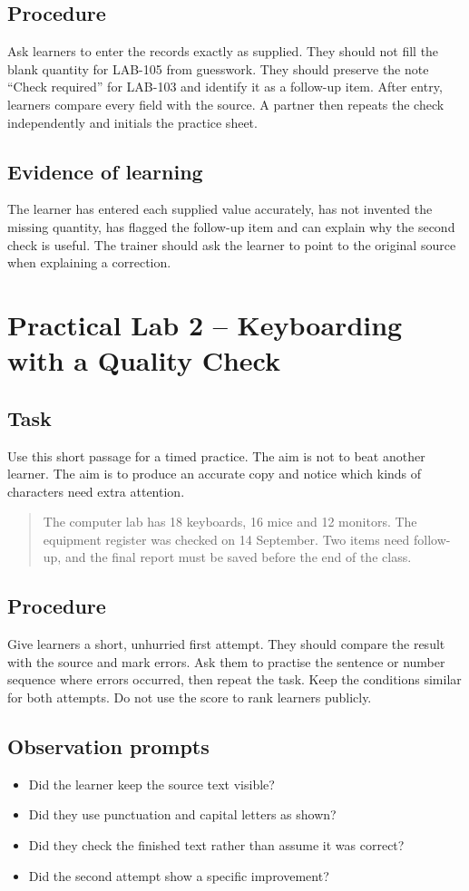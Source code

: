 \documentclass[11pt,openany,oneside]{book}
\begin{document}
\section{Procedure}
Ask learners to enter the records exactly as supplied. They should not fill the blank quantity for LAB-105 from guesswork. They should preserve the note “Check required” for LAB-103 and identify it as a follow-up item. After entry, learners compare every field with the source. A partner then repeats the check independently and initials the practice sheet.
\section{Evidence of learning}
The learner has entered each supplied value accurately, has not invented the missing quantity, has flagged the follow-up item and can explain why the second check is useful. The trainer should ask the learner to point to the original source when explaining a correction.

\chapter{Practical Lab 2 -- Keyboarding with a Quality Check}
\section{Task}
Use this short passage for a timed practice. The aim is not to beat another learner. The aim is to produce an accurate copy and notice which kinds of characters need extra attention.
\begin{quote}\small
The computer lab has 18 keyboards, 16 mice and 12 monitors. The equipment register was checked on 14 September. Two items need follow-up, and the final report must be saved before the end of the class.
\end{quote}
\section{Procedure}
Give learners a short, unhurried first attempt. They should compare the result with the source and mark errors. Ask them to practise the sentence or number sequence where errors occurred, then repeat the task. Keep the conditions similar for both attempts. Do not use the score to rank learners publicly.
\section{Observation prompts}
\begin{itemize}
\item Did the learner keep the source text visible?
\item Did they use punctuation and capital letters as shown?
\item Did they check the finished text rather than assume it was correct?
\item Did the second attempt show a specific improvement?
\end{itemize}
\end{document}
